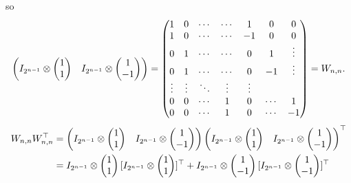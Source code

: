 \documentclass[12pt]{article}
\begin{document}
so 
\[
\begin{pmatrix}
I_{2^{n-1}} \otimes 
\begin{pmatrix}
1 \\
1
\end{pmatrix}
&
I_{2^{n-1}} \otimes 
\begin{pmatrix}
1 \\
-1
\end{pmatrix}
\end{pmatrix}
=
\begin{pmatrix}
1 & 0 & \cdots & \cdots  & 1  & 0 & 0 \\
1 & 0 & \cdots & \cdots  & -1 & 0 & 0 \\
0 & 1 & \cdots & \cdots  & 0  & 1 & \vdots \\
0 & 1 & \cdots & \cdots  & 0  & -1 & \vdots \\
\vdots  & \vdots & \ddots & \vdots & \vdots \\
0 & 0 & \cdots &1 &0  & \cdots & 1 \\
0 & 0 & \cdots &1 &0  & \cdots & -1 
\end{pmatrix} 
= W_{n,n}.
\]
\begin{align*}
W_{n, n} \transpos{W_{n, n}} &= 
\begin{pmatrix}
I_{2^{n-1}} \tensor 
\begin{pmatrix}
1 \\
1
\end{pmatrix}
& 
I_{2^{n-1}} \tensor 
\begin{pmatrix}
1 \\
-1
\end{pmatrix}
\end{pmatrix}
\transpos{
\begin{pmatrix}
I_{2^{n-1}} \tensor 
\begin{pmatrix}
1 \\
1
\end{pmatrix}
& 
I_{2^{n-1}} \tensor 
\begin{pmatrix}
1 \\
-1
\end{pmatrix}
\end{pmatrix}} \\
&=
I_{2^{n-1}} \tensor 
\begin{pmatrix}
1 \\
1
\end{pmatrix}
\transpos{[
I_{2^{n-1}} \tensor 
\begin{pmatrix}
1 \\
1
\end{pmatrix}
]} + 
I_{2^{n-1}} \tensor 
\begin{pmatrix}
1 \\
-1
\end{pmatrix}
\transpos{[
I_{2^{n-1}} \tensor 
\begin{pmatrix}
1 \\
-1
\end{pmatrix}]
} \\
\end{align*}
\end{document}
